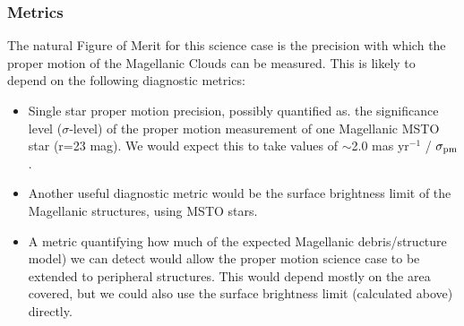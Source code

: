 
\subsubsection{Metrics}
\label{sec:\chpname:metrics}

The natural Figure of Merit for this science case is the precision
with which the proper motion of the Magellanic Clouds can be measured.
This is likely to depend on the following diagnostic metrics:


\begin{itemize}

\item  Single star proper motion precision, possibly quantified as.
the significance level
($\sigma$-level) of the proper motion measurement of one Magellanic MSTO
star (r=23 mag). We would expect this to take values of
$\sim$2.0 mas yr$^{-1}$ / $\sigma_{\rm pm}$.

\item Another useful diagnostic metric would be the surface
brightness limit of the Magellanic structures, using MSTO stars.

\item A metric quantifying how much of the expected Magellanic debris/structure
\citet[from][]{2012MNRAS.421.2109B} model) we can detect would allow the
proper motion science case to be extended to peripheral structures.
This would depend
mostly on the area covered, but we could also use the surface
brightness limit (calculated above) directly.

\end{itemize}

